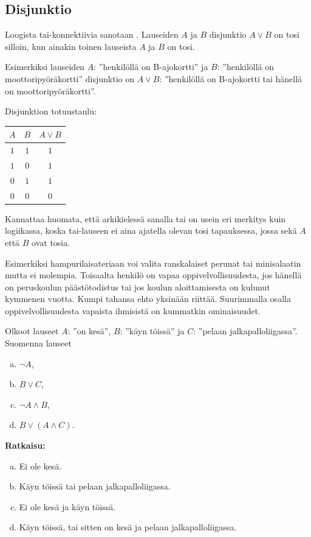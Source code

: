 \bigskip

\subsection*{Disjunktio} Loogista tai-konnektiivia sanotaan . Lauseiden $A$ ja $B$ disjunktio $A\lor B$ on tosi silloin, kun ainakin toinen lauseista $A$ ja $B$ on tosi.


Esimerkiksi lauseiden $A$: ''henkilöllä on B-ajokortti'' ja $B$: ''henkilöllä on moottoripyöräkortti'' disjunktio on $A \lor B$: ''henkilöllä on B-ajokortti tai hänellä on moottoripyöräkortti''. 

Disjunktion totuustaulu:
 
\bigskip

\begin{center}
\begin{tabular}{|c|c|c|}\hline
$A$ & $B$ & $A\lor B$ \\ \hline
$1$ & $1$ & $1$\\ 
$1$ & $0$ & $1$\\
$0$ & $1$ & $1$\\
$0$ & $0$ & $0$\\ \hline
\end{tabular}
\end{center}

\bigskip

Kannattaa huomata, että arkikielessä sanalla tai on usein eri merkitys kuin logiikassa, koska tai-lauseen ei aina ajatella olevan tosi tapauksessa, jossa sekä $A$ että $B$ ovat tosia.

Esimerkiksi hampurilaisateriaan voi valita ranskalaiset perunat tai minisalaatin mutta ei molempia. Toisaalta henkilö on vapaa oppivelvollisuudesta, jos hänellä on peruskoulun päästötodistus tai jos koulun aloittamisesta on kulunut kymmenen vuotta. Kumpi tahansa ehto yksinään riittää. Suurimmalla osalla oppivelvollisuudesta vapaista ihmisistä on kummatkin ominaisuudet.

\newpage

\begin{esimerkki}
Olkoot lauseet $A$: ''on kesä'', $B$: ''käyn töissä'' ja $C$: ''pelaan jalkapalloliigassa''. Suomenna lauseet
\begin{enumerate}[a)]
\item $\lnot A$, 
\item $B\lor C$,
\item $\lnot A\land B$,
\item $B\lor (A\land C)$.
\end{enumerate}

{\bf Ratkaisu:}
\begin{enumerate}[a)]
\item Ei ole kesä.
\item Käyn töissä tai pelaan jalkapalloliigassa.
\item Ei ole kesä ja käyn töissä.
\item Käyn töissä, tai sitten on kesä ja pelaan jalkapalloliigassa.
\end{enumerate}
\end{esimerkki}


